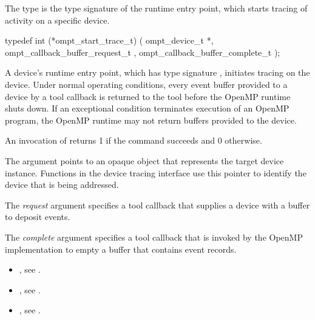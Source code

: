 \summary
The  type is the type signature of the 
 runtime entry point, which starts tracing 
of activity on a specific device.

\format
\begin{ccppspecific}
\begin{omptInquiry}
typedef int (*ompt_start_trace_t) (
  ompt_device_t *,
  ompt_callback_buffer_request_t ,
  ompt_callback_buffer_complete_t 
);
\end{omptInquiry}
\end{ccppspecific}

\descr
A device's  runtime entry point, which has type
signature , initiates tracing on the device.
Under normal operating conditions, every event buffer provided to a 
device by a tool callback is returned to the tool before the OpenMP 
runtime shuts down. If an exceptional condition terminates  execution 
of an OpenMP program, the OpenMP runtime may not return buffers provided 
to the device.

An invocation of  returns 1 if the command
succeeds and 0 otherwise.

\argdesc
The  argument points to an opaque object that represents
the target device instance. Functions in the device tracing interface
use this pointer to identify the device that is being addressed.

The \emph{request} argument specifies a tool callback that supplies
a device with a buffer to deposit events.

The \emph{complete} argument specifies a tool callback that is invoked 
by the OpenMP implementation to empty a buffer that contains event records.

\crossreferences
\begin{itemize}
\item {}, see .

\item {}, 
see .

\item {}, 
see .
\end{itemize}



\subsubsection{}
\label{sec:ompt_pause_trace_t}

